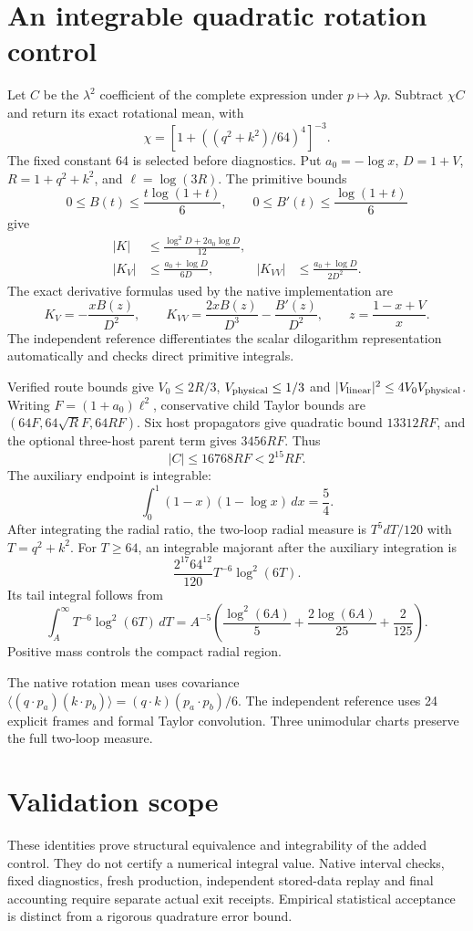 \documentclass[11pt]{article}
\begin{document}
\section*{An integrable quadratic rotation control}
Let $C$ be the $\lambda^2$ coefficient of the complete expression under
$p\mapsto\lambda p$. Subtract $\chi C$ and return its exact rotational mean, with
\[
 \chi=\left[1+\left((q^2+k^2)/64\right)^4\right]^{-3}.
\]
The fixed constant 64 is selected before diagnostics. Put
$a_0=-\log x$, $D=1+V$, $R=1+q^2+k^2$, and $\ell=\log(3R)$.
The primitive bounds
\[
 0\leq B(t)\leq\frac{t\log(1+t)}6,\qquad
 0\leq B'(t)\leq\frac{\log(1+t)}6
\]
give
\begin{align}
 |K|&\leq\frac{\log^2D+2a_0\log D}{12},\\
 |K_V|&\leq\frac{a_0+\log D}{6D},&
 |K_{VV}|&\leq\frac{a_0+\log D}{2D^2}.
\end{align}
The exact derivative formulas used by the native implementation are
\[
 K_V=-\frac{xB(z)}{D^2},\qquad
 K_{VV}=\frac{2xB(z)}{D^3}-\frac{B'(z)}{D^2},\qquad
 z=\frac{1-x+V}{x}.
\]
The independent reference differentiates the scalar dilogarithm representation
automatically and checks direct primitive integrals.

Verified route bounds give $V_0\leq2R/3$, $V_{\rm physical}\leq1/3$ and
$|V_{\rm linear}|^2\leq4V_0V_{\rm physical}$.
Writing $F=(1+a_0)\ell^2$, conservative child Taylor bounds are
$(64F,64\sqrt R F,64RF)$. Six host propagators give quadratic bound $13312RF$,
and the optional three-host parent term gives $3456RF$. Thus
\[
 |C|\leq16768RF<2^{15}RF.
\]
The auxiliary endpoint is integrable:
\[
 \int_0^1(1-x)(1-\log x)\,dx=\frac54.
\]
After integrating the radial ratio, the two-loop radial measure is $T^5dT/120$
with $T=q^2+k^2$. For $T\geq64$, an integrable majorant after the auxiliary
integration is
\[
 \frac{2^{17}64^{12}}{120}T^{-6}\log^2(6T).
\]
Its tail integral follows from
\[
 \int_A^\infty T^{-6}\log^2(6T)\,dT
 =A^{-5}\left(\frac{\log^2(6A)}5+
             \frac{2\log(6A)}{25}+\frac2{125}\right).
\]
Positive mass controls the compact radial region.

The native rotation mean uses covariance
$\langle(q\cdot p_a)(k\cdot p_b)\rangle=(q\cdot k)(p_a\cdot p_b)/6$.
The independent reference uses 24 explicit frames and formal Taylor convolution.
Three unimodular charts preserve the full two-loop measure.

\section*{Validation scope}
These identities prove structural equivalence and integrability of the added
control. They do not certify a numerical integral value. Native interval checks,
fixed diagnostics, fresh production, independent stored-data replay and final
accounting require separate actual exit receipts. Empirical statistical acceptance
is distinct from a rigorous quadrature error bound.
\end{document}
